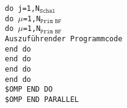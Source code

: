 \null\quad\texttt{do j=1,N$_{\texttt{Schal}}$}\\ 
\null\quad\quad\texttt{do $\mu$=1,N$_{\texttt{Prim BF}}$}\\ 
\null\quad\quad\quad\texttt{do $\mu$=1,N$_{\texttt{Prim BF}}$}\\
\null\quad\quad\quad\quad \texttt{Auszuführender Programmcode}\\ 
\null\quad\quad\quad\texttt{end do}\\ 
\null\quad\quad\texttt{end do}\\ 
\null\quad\texttt{end do}\\ 
\texttt{end do}\\
\texttt{\$OMP END DO}\\
\texttt{\$OMP END PARALLEL}\\
\\

